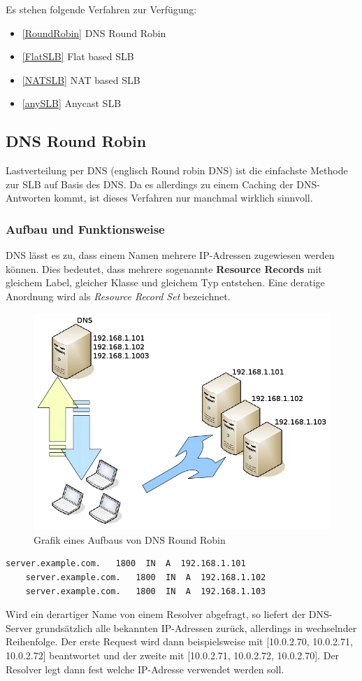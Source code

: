 Es stehen folgende Verfahren zur Verfügung:
\begin{itemize}
	\item \ref{RoundRobin} DNS Round Robin
	\item \ref{FlatSLB} Flat based SLB
	\item \ref{NATSLB} NAT based SLB
	\item \ref{anySLB} Anycast SLB
\end{itemize}

\newpage
\subsection{DNS Round Robin}\cite{LastverteilungPerDNS}
\label{RoundRobin}

Lastverteilung per DNS (englisch Round robin DNS) ist die einfachste Methode zur SLB auf Basis des DNS. Da es allerdings zu einem Caching der DNS-Antworten kommt, ist dieses Verfahren nur manchmal wirklich sinnvoll.

\subsubsection{Aufbau und Funktionsweise}\cite{RoundRobinDNS}
DNS lässt es zu, dass einem Namen mehrere IP-Adressen zugewiesen werden können. Dies bedeutet, dass mehrere sogenannte \textbf{Resource Records} mit gleichem Label, gleicher Klasse und gleichem Typ entstehen. Eine deratige Anordnung wird als \textit{Resource Record Set} bezeichnet.

\begin{figure}[!h]
	\begin{center}
		\includegraphics[width=0.5\linewidth]{images/RR-DNS}
		\caption{Grafik eines Aufbaus von DNS Round Robin}
		\label{broker}
	\end{center}
\end{figure}
\begin{center}

\begin{lstlisting}[caption=DNS Round Robin Example]
    server.example.com.   1800  IN  A  192.168.1.101
    server.example.com.   1800  IN  A  192.168.1.102
    server.example.com.   1800  IN  A  192.168.1.103
\end{lstlisting}
\end{center}
Wird ein derartiger Name von einem Resolver abgefragt, so liefert der DNS-Server grundsätzlich alle bekannten IP-Adressen zurück, allerdings in wechselnder Reihenfolge. Der erste Request wird dann beispielsweise mit [10.0.2.70, 10.0.2.71, 10.0.2.72] beantwortet und der zweite mit [10.0.2.71, 10.0.2.72, 10.0.2.70]. Der Resolver legt dann fest welche IP-Adresse verwendet werden soll.


